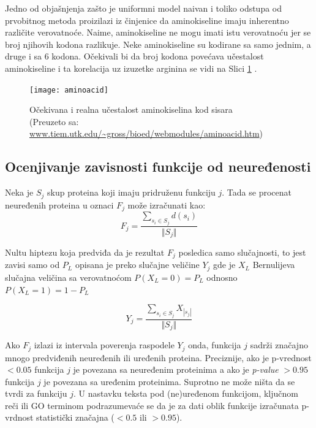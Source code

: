 Jedno od objašnjenja zašto je uniformni model naivan i toliko odstupa od
prvobitnog metoda proizilazi iz činjenice da aminokiseline imaju inherentno
različite verovatnoće. Naime, aminokiseline ne mogu  imati istu
verovatnoću jer se  broj njihovih kodona razlikuje. Neke aminokiseline
su kodirane sa samo jednim, a druge i sa 6 kodona. Očekivali bi da broj kodona
povećava učestalost aminokiseline i ta korelacija uz izuzetke arginina se vidi
na Slici \ref{fig:aminoacid} \parencite{AKfrekvencija}.

\begin{figure}[th]
\centering
\texttt{[image: aminoacid]}
\caption{Očekivana i realna učestalost  aminokiselina kod sisara\\ \footnotesize
(Preuzeto sa: \url{www.tiem.utk.edu/~gross/bioed/webmodules/aminoacid.htm})}
\label{fig:aminoacid}
\end{figure}



\clearpage
\subsection{Ocenjivanje zavisnosti funkcije od neuređenosti}

Neka je $S_j$ skup proteina koji imaju pridruženu funkciju $j$. Tada se procenat
neuređenih proteina u oznaci $F_j$ može izračunati kao:
$$F_j = \dfrac{\sum_{s_i \in S_j} d(s_i)} {\Vert S_j \Vert} $$

Nultu hiptezu koja predviđa da je rezultat $F_j$ posledica samo slučajnosti, to
jest zavisi samo od $P_L$ opisana je preko slučajne veličine $Y_j$ gde je $X_L$
Bernulijeva slučajna veličina sa verovatnoćom $P(X_L = 0) = P_L$ odnosno $P(X_L
= 1) = 1-P_L$

$$ Y_j = \dfrac {\sum_{s_i \in S_j} {X_{|s_j|}}}{\Vert S_j \Vert}$$

Ako $F_j$ izlazi iz intervala poverenja raspodele $Y_j$ onda, funkcija $j$
sadrži značajno mnogo predviđenih neuređenih ili uređenih proteina. Preciznije,
ako je p-vrednost  $<0.05$ funkcija $j$ je povezana sa neuređenim
proteinima a ako je \textit{p-value} $>0.95$ funkcija $j$ je povezana sa
uređenim proteinima. Suprotno ne može ništa da se tvrdi za funkciju $j$.  U
nastavku teksta pod (ne)uređenom funkcijom, ključnom reči  ili GO terminom
podrazumevaće se da je za dati oblik funkcije izračunata p-vrdnost statistički
značajna ($<0.5$ ili $>0.95$).


